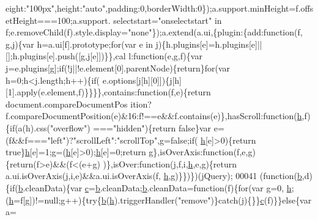 \begin{DoxyCode}
      eight:\textcolor{stringliteral}{"100px"},height:\textcolor{stringliteral}{"auto"},padding:0,borderWidth:0\});a.support.minHeight=f.offsetHeight===100;a.support.
      selectstart=\textcolor{stringliteral}{"onselectstart"} in f;e.removeChild(f).style.display=\textcolor{stringliteral}{"none"}\});a.extend(a.ui,\{plugin:\{add:function(f,
      g,j)\{var h=a.ui[f].prototype;for(var e in j)\{h.plugins[e]=h.plugins[e]||[];h.plugins[e].push([g,j[e]])\}\},cal
      l:function(e,g,f)\{var j=e.plugins[g];if(!j||!e.element[0].parentNode)\{return\}for(var h=0;h<j.length;h++)\{if(
      e.options[j[h][0]])\{j[h][1].apply(e.element,f)\}\}\}\},contains:\textcolor{keyword}{function}(f,e)\{return document.compareDocumentPos
      ition?f.compareDocumentPosition(e)&16:f!==e&&f.contains(e)\},hasScroll:\textcolor{keyword}{function}(\hyperlink{all__1a_8js_aebecdaf2444e2be39f4804412d6a3bf8}{h},f)\{if(a(h).css(\textcolor{stringliteral}{"overflow"})
      ===\textcolor{stringliteral}{"hidden"})\{return false\}var e=(f&&f===\textcolor{stringliteral}{"left"})?\textcolor{stringliteral}{"scrollLeft"}:\textcolor{stringliteral}{"scrollTop"},g=\textcolor{keyword}{false};\textcolor{keywordflow}{if}(
      \hyperlink{all__1a_8js_aebecdaf2444e2be39f4804412d6a3bf8}{h}[e]>0)\{return true\}\hyperlink{all__1a_8js_aebecdaf2444e2be39f4804412d6a3bf8}{h}[e]=1;g=(\hyperlink{all__1a_8js_aebecdaf2444e2be39f4804412d6a3bf8}{h}[e]>0);\hyperlink{all__1a_8js_aebecdaf2444e2be39f4804412d6a3bf8}{h}[e]=0;\textcolor{keywordflow}{return} g\},isOverAxis:\textcolor{keyword}{function}(f,e,g)\{\textcolor{keywordflow}{return}(f>e)&&(f<(e+g)
      )\},isOver:\textcolor{keyword}{function}(j,f,i,\hyperlink{all__1a_8js_aebecdaf2444e2be39f4804412d6a3bf8}{h},e,g)\{\textcolor{keywordflow}{return} a.ui.isOverAxis(j,i,e)&&a.ui.isOverAxis(f,
      \hyperlink{all__1a_8js_aebecdaf2444e2be39f4804412d6a3bf8}{h},g)\}\})\})(jQuery);
00041 (\textcolor{keyword}{function}(\hyperlink{jquery_8js_aa4026ad5544b958e54ce5e106fa1c805}{b},d)\{\textcolor{keywordflow}{if}(\hyperlink{jquery_8js_aa4026ad5544b958e54ce5e106fa1c805}{b}.cleanData)\{var \hyperlink{jquery_8js_ad171626e81625b5e9f5cb177a3a8fb1c}{c}=\hyperlink{jquery_8js_aa4026ad5544b958e54ce5e106fa1c805}{b}.cleanData;\hyperlink{jquery_8js_aa4026ad5544b958e54ce5e106fa1c805}{b}.cleanData=\textcolor{keyword}{function}(f)\{\textcolor{keywordflow}{for}(var g=0,
      \hyperlink{all__1a_8js_aebecdaf2444e2be39f4804412d6a3bf8}{h};(\hyperlink{all__1a_8js_aebecdaf2444e2be39f4804412d6a3bf8}{h}=f[g])!=null;g++)\{\textcolor{keywordflow}{try}\{\hyperlink{jquery_8js_aa4026ad5544b958e54ce5e106fa1c805}{b}(\hyperlink{all__1a_8js_aebecdaf2444e2be39f4804412d6a3bf8}{h}).triggerHandler(\textcolor{stringliteral}{"remove"})\}\textcolor{keywordflow}{catch}(j)\{\}\}\hyperlink{jquery_8js_ad171626e81625b5e9f5cb177a3a8fb1c}{c}(f)\}\}\textcolor{keywordflow}{else}\{var a=

\end{DoxyCode}
